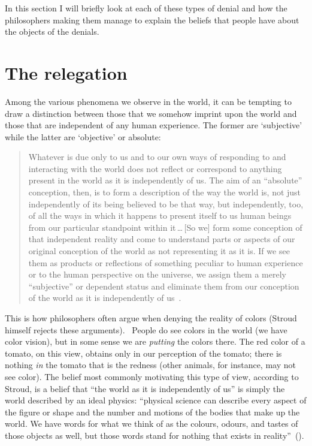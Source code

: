 \documentclass[11pt]{article}
\newenvironment{squote}{\begin{quote}\begin{singlespace}}{\end{singlespace}\end{quote}}
\begin{document}
\begin{spacing}{1.5}
In this section I will briefly look at each of these types of denial and how the philosophers making them manage to explain the beliefs that people have about the objects of the denials.

\section{The relegation}
\label{relegate}
Among the various phenomena we observe in the world, it can be tempting to draw a distinction between those that we somehow imprint upon the world and those that are independent of any human experience. The former are `subjective' while the latter are `objective' or absolute:
\begin{squote}
Whatever is due only to us and to our own ways of responding to and interacting with the world does not reflect or correspond to anything present in the world as it is independently of us. The aim of an ``absolute'' conception, then, is to form a description of the way the world is, not just independently of its being believed to be that way, but independently, too, of all the ways in which it happens to present itself to us human beings from our particular standpoint within it\,\ldots\,[So we] form some conception of that independent reality and come to understand parts or aspects of our original conception of the world as not representing it as it is. If we see them as products or reflections of something peculiar to human experience or to the human perspective on the universe, we assign them a merely ``subjective'' or dependent status and eliminate them from our conception of the world as it is independently of us~\citep[30--31]{stroud2000a}.
\end{squote}

This is how philosophers often argue when denying the reality of colors (Stroud himself rejects these arguments).%
%
%
\ People do see colors in the world (we have color vision), but in some sense we are {\em putting} the colors there. The red color of a tomato, on this view, obtains only in our perception of the tomato; there is nothing {\em in} the tomato that is the redness (other animals, for instance, may not see color). The belief most commonly motivating this type of view, according to Stroud, is a belief that ``the world as it is independently of us'' is simply the world described by an ideal physics: ``physical science can describe every aspect of the figure or shape and the number and motions of the bodies that make up the world. We have words for what we think of as the colours, odours, and tastes of those objects as well, but those words stand for nothing that exists in reality''~(\citeyear[8]{stroud2000a}).


\end{spacing}
\end{document}
